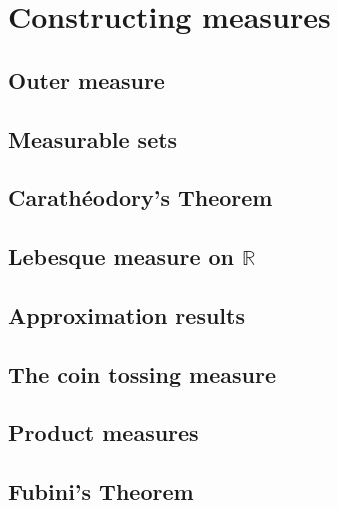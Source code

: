 \chapter{Constructing measures}

\section{Outer measure}
\section{Measurable sets}
\section{Carathéodory's Theorem}
\section{Lebesque measure on \( \mathbb{R} \)}
\section{Approximation results}
\section{The coin tossing measure}
\section{Product measures}
\section{Fubini's Theorem}

